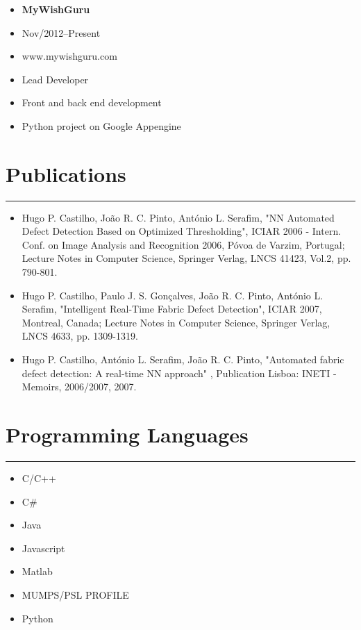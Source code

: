 \documentclass[a4paper,english]{article}
\newcommand{\topic}[1]{
\section*{#1} \vspace{-6mm}
\rule{\columnwidth}{.25mm}
}
\begin{document}
\vspace{0.5cm}
\begin{minipage}[t]{0.5\linewidth}
    \begin{itemize}
    \setlength{\itemsep}{-1mm}
        \item[] {\bf MyWishGuru}
        \item[] Nov/2012--Present
        \item[] www.mywishguru.com
    \end{itemize}
\end{minipage}
\begin{minipage}[t]{0.5\linewidth}
    \begin{itemize}
    \setlength{\itemsep}{-1mm}
        \item[] Lead Developer
        \item[] Front and back end development
        \item[] Python project on Google Appengine
    \end{itemize}
\end{minipage}

\topic{Publications}
\begin{itemize}
    \item[] Hugo P. Castilho, João R. C. Pinto, António L. Serafim, "NN
Automated Defect Detection Based on Optimized Thresholding", ICIAR 2006 -
Intern. Conf. on Image Analysis and Recognition 2006, Póvoa
de Varzim, Portugal; Lecture Notes in Computer Science, Springer Verlag,
LNCS 41423, Vol.2, pp. 790-801.
    \item[] Hugo P. Castilho, Paulo J. S. Gonçalves, João R. C. Pinto, António
L. Serafim, "Intelligent Real-Time Fabric Defect Detection", ICIAR
2007, Montreal, Canada; Lecture Notes in Computer Science, Springer Verlag,
LNCS 4633, pp. 1309-1319.
    \item[] Hugo P. Castilho, António L. Serafim, João R. C. Pinto, "Automated
fabric defect detection: A real-time NN approach" , Publication Lisboa: INETI - 
Memoirs, 2006/2007, 2007.
\end{itemize}

\topic{Programming Languages}
\begin{itemize}
\setlength{\itemsep}{-1mm}
    \item C/C++
    \item C\#
    \item Java
    \item Javascript
    \item Matlab
    \item MUMPS/PSL PROFILE
    \item Python
\end{itemize}
\end{document}
